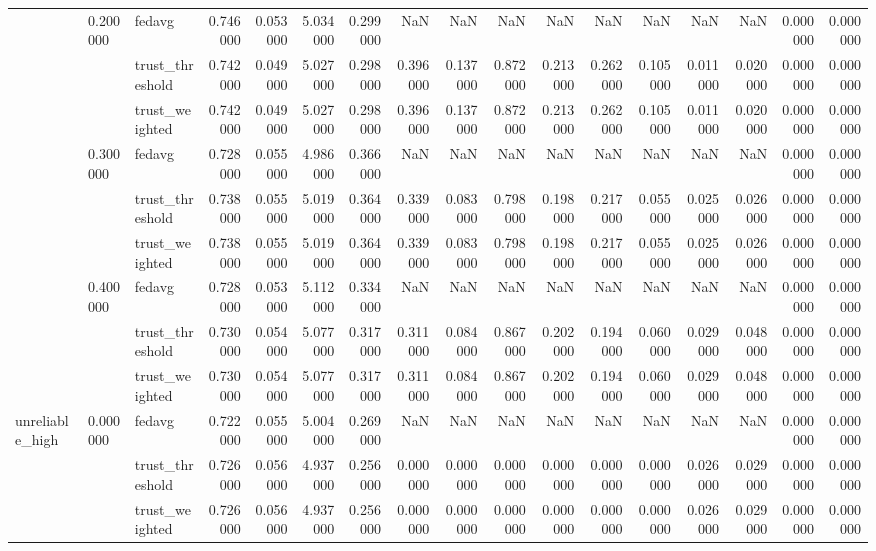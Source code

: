 \begin{tabular}{lllrrrrrrrrrrrrrr}
\cline{2-17}
 & \multirow[t]{3}{*}{0.200000} & fedavg & 0.746000 & 0.053000 & 5.034000 & 0.299000 & NaN & NaN & NaN & NaN & NaN & NaN & NaN & NaN & 0.000000 & 0.000000 \\
 &  & trust_threshold & 0.742000 & 0.049000 & 5.027000 & 0.298000 & 0.396000 & 0.137000 & 0.872000 & 0.213000 & 0.262000 & 0.105000 & 0.011000 & 0.020000 & 0.000000 & 0.000000 \\
 &  & trust_weighted & 0.742000 & 0.049000 & 5.027000 & 0.298000 & 0.396000 & 0.137000 & 0.872000 & 0.213000 & 0.262000 & 0.105000 & 0.011000 & 0.020000 & 0.000000 & 0.000000 \\
\cline{2-17}
 & \multirow[t]{3}{*}{0.300000} & fedavg & 0.728000 & 0.055000 & 4.986000 & 0.366000 & NaN & NaN & NaN & NaN & NaN & NaN & NaN & NaN & 0.000000 & 0.000000 \\
 &  & trust_threshold & 0.738000 & 0.055000 & 5.019000 & 0.364000 & 0.339000 & 0.083000 & 0.798000 & 0.198000 & 0.217000 & 0.055000 & 0.025000 & 0.026000 & 0.000000 & 0.000000 \\
 &  & trust_weighted & 0.738000 & 0.055000 & 5.019000 & 0.364000 & 0.339000 & 0.083000 & 0.798000 & 0.198000 & 0.217000 & 0.055000 & 0.025000 & 0.026000 & 0.000000 & 0.000000 \\
\cline{2-17}
 & \multirow[t]{3}{*}{0.400000} & fedavg & 0.728000 & 0.053000 & 5.112000 & 0.334000 & NaN & NaN & NaN & NaN & NaN & NaN & NaN & NaN & 0.000000 & 0.000000 \\
 &  & trust_threshold & 0.730000 & 0.054000 & 5.077000 & 0.317000 & 0.311000 & 0.084000 & 0.867000 & 0.202000 & 0.194000 & 0.060000 & 0.029000 & 0.048000 & 0.000000 & 0.000000 \\
 &  & trust_weighted & 0.730000 & 0.054000 & 5.077000 & 0.317000 & 0.311000 & 0.084000 & 0.867000 & 0.202000 & 0.194000 & 0.060000 & 0.029000 & 0.048000 & 0.000000 & 0.000000 \\
\cline{1-17} \cline{2-17}
\multirow[t]{3}{*}{unreliable_high} & \multirow[t]{3}{*}{0.000000} & fedavg & 0.722000 & 0.055000 & 5.004000 & 0.269000 & NaN & NaN & NaN & NaN & NaN & NaN & NaN & NaN & 0.000000 & 0.000000 \\
 &  & trust_threshold & 0.726000 & 0.056000 & 4.937000 & 0.256000 & 0.000000 & 0.000000 & 0.000000 & 0.000000 & 0.000000 & 0.000000 & 0.026000 & 0.029000 & 0.000000 & 0.000000 \\
 &  & trust_weighted & 0.726000 & 0.056000 & 4.937000 & 0.256000 & 0.000000 & 0.000000 & 0.000000 & 0.000000 & 0.000000 & 0.000000 & 0.026000 & 0.029000 & 0.000000 & 0.000000 \\

\end{tabular}
